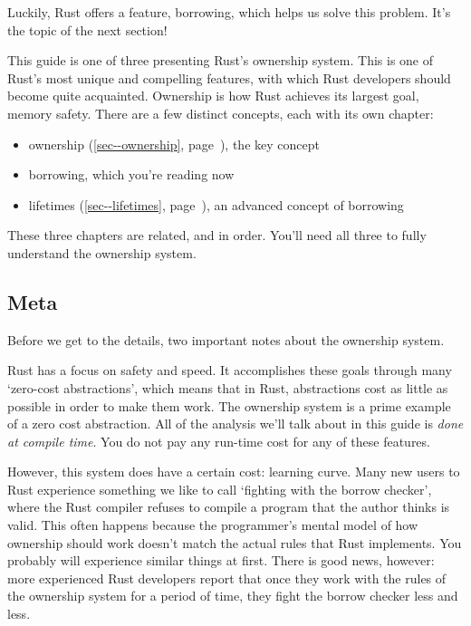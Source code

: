 \documentclass[a4paper,]{book}
\renewcommand*{\hyperref}[2][\ar]{%
  \def\ar{#2}%
  #2 (\autoref{#1}, page~\pageref{#1})}
\providecommand{\tightlist}{%
  \setlength{\itemsep}{0pt}\setlength{\parskip}{0pt}}
\begin{document}
Luckily, Rust offers a feature, borrowing, which helps us solve this
problem. It's the topic of the next section!


This guide is one of three presenting Rust's ownership system. This is
one of Rust's most unique and compelling features, with which Rust
developers should become quite acquainted. Ownership is how Rust
achieves its largest goal, memory safety. There are a few distinct
concepts, each with its own chapter:

\begin{itemize}
\tightlist
\item
  \hyperref[sec--ownership]{ownership}, the key concept
\item
  borrowing, which you're reading now
\item
  \hyperref[sec--lifetimes]{lifetimes}, an advanced concept of borrowing
\end{itemize}

These three chapters are related, and in order. You'll need all three to
fully understand the ownership system.

\subsection{Meta}\label{meta-1}

Before we get to the details, two important notes about the ownership
system.

Rust has a focus on safety and speed. It accomplishes these goals
through many `zero-cost abstractions', which means that in Rust,
abstractions cost as little as possible in order to make them work. The
ownership system is a prime example of a zero cost abstraction. All of
the analysis we'll talk about in this guide is \emph{done at compile
time}. You do not pay any run-time cost for any of these features.

However, this system does have a certain cost: learning curve. Many new
users to Rust experience something we like to call `fighting with the
borrow checker', where the Rust compiler refuses to compile a program
that the author thinks is valid. This often happens because the
programmer's mental model of how ownership should work doesn't match the
actual rules that Rust implements. You probably will experience similar
things at first. There is good news, however: more experienced Rust
developers report that once they work with the rules of the ownership
system for a period of time, they fight the borrow checker less and
less.
\end{document}
